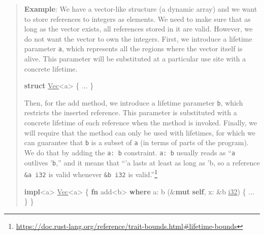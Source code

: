 \documentclass[
  11pt,
  twoside,symmetric]{report}
\newenvironment{Shaded}{}{}
\newcommand{\DataTypeTok}[1]{\underline{#1}}
\newcommand{\KeywordTok}[1]{\textbf{#1}}
\newcommand{\NormalTok}[1]{#1}
\newcommand{\OperatorTok}[1]{#1}
\newcommand{\OtherTok}[1]{#1}
\DeclareRobustCommand{\href}[2]{#2\footnote{\url{#1}}}
\begin{document}
\begin{quote}
\textbf{Example}: We have a vector-like structure (a dynamic array) and
we want to store references to integers as elements. We need to make
sure that as long as the vector exists, all references stored in it are
valid. However, we do not want the vector to own the integers. First, we
introduce a lifetime parameter \texttt{\textquotesingle{}a}, which
represents all the regions where the vector itself is alive. This
parameter will be substituted at a particular use site with a concrete
lifetime.

\begin{Shaded}
\begin{Highlighting}[]
\KeywordTok{struct} \DataTypeTok{Vec}\OperatorTok{\textless{}}\OtherTok{\textquotesingle{}a}\OperatorTok{\textgreater{}} \OperatorTok{\{} \OperatorTok{...} \OperatorTok{\}}
\end{Highlighting}
\end{Shaded}

Then, for the add method, we introduce a lifetime parameter
\texttt{\textquotesingle{}b}, which restricts the inserted reference.
This parameter is substituted with a concrete lifetime of each reference
when the method is invoked. Finally, we will require that the method can
only be used with lifetimes, for which we can guarantee that
\texttt{\textquotesingle{}b} is a subset of \texttt{\textquotesingle{}a}
(in terms of parts of the program). We do that by adding the
\texttt{\textquotesingle{}a:\ \textquotesingle{}b} constraint.
\texttt{\textquotesingle{}a:\ \textquotesingle{}b} usually reads as
``\texttt{\textquotesingle{}a} outlives '\texttt{b},'' and it means that
``'a lasts at least as long as 'b, so a reference
\texttt{\&\textquotesingle{}a\ i32} is valid whenever
\texttt{\&\textquotesingle{}b\ i32} is
valid.''\href{https://doc.rust-lang.org/reference/trait-bounds.html\#lifetime-bounds}{\citeproc{ref-reference}{{[}7{]}}}

\begin{Shaded}
\begin{Highlighting}[]
\KeywordTok{impl}\OperatorTok{\textless{}}\OtherTok{\textquotesingle{}a}\OperatorTok{\textgreater{}} \DataTypeTok{Vec}\OperatorTok{\textless{}}\OtherTok{\textquotesingle{}a}\OperatorTok{\textgreater{}} \OperatorTok{\{}
  \KeywordTok{fn}\NormalTok{ add}\OperatorTok{\textless{}}\OtherTok{\textquotesingle{}b}\OperatorTok{\textgreater{}} \KeywordTok{where} \OtherTok{\textquotesingle{}a}\OperatorTok{:} \OtherTok{\textquotesingle{}b}\NormalTok{ (}\OperatorTok{\&}\KeywordTok{mut} \KeywordTok{self}\OperatorTok{,}\NormalTok{ x}\OperatorTok{:} \OperatorTok{\&}\OtherTok{\textquotesingle{}b} \DataTypeTok{i32}\NormalTok{) }\OperatorTok{\{} \OperatorTok{...} \OperatorTok{\}}
\OperatorTok{\}}
\end{Highlighting}
\end{Shaded}
\end{quote}
\end{document}
